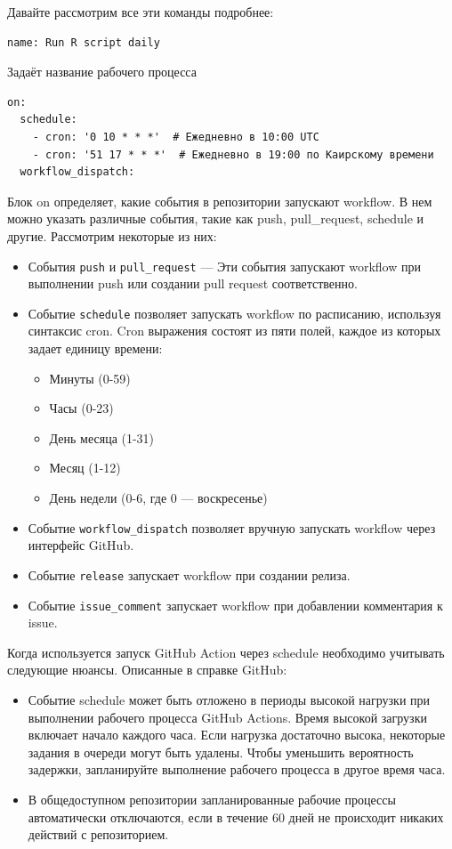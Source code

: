 \documentclass[
]{book}
\providecommand{\tightlist}{%
  \setlength{\itemsep}{0pt}\setlength{\parskip}{0pt}}
\begin{document}
Давайте рассмотрим все эти команды подробнее:

\begin{verbatim}
name: Run R script daily
\end{verbatim}

Задаёт название рабочего процесса

\begin{verbatim}
on:
  schedule:
    - cron: '0 10 * * *'  # Ежедневно в 10:00 UTC
    - cron: '51 17 * * *'  # Ежедневно в 19:00 по Каирскому времени
  workflow_dispatch:
\end{verbatim}

Блок on определяет, какие события в репозитории запускают workflow. В нем можно указать различные события, такие как push, pull\_request, schedule и другие. Рассмотрим некоторые из них:

\begin{itemize}
\tightlist
\item
  События \texttt{push} и \texttt{pull\_request} --- Эти события запускают workflow при выполнении push или создании pull request соответственно.
\item
  Событие \texttt{schedule} позволяет запускать workflow по расписанию, используя синтаксис cron. Cron выражения состоят из пяти полей, каждое из которых задает единицу времени:

  \begin{itemize}
  \tightlist
  \item
    Минуты (0-59)
  \item
    Часы (0-23)
  \item
    День месяца (1-31)
  \item
    Месяц (1-12)
  \item
    День недели (0-6, где 0 --- воскресенье)
  \end{itemize}
\item
  Событие \texttt{workflow\_dispatch} позволяет вручную запускать workflow через интерфейс GitHub.
\item
  Событие \texttt{release} запускает workflow при создании релиза.
\item
  Событие \texttt{issue\_comment} запускает workflow при добавлении комментария к issue.
\end{itemize}

Когда используется запуск GitHub Action через schedule необходимо учитывать следующие нюансы. Описанные в справке GitHub:

\begin{itemize}
\tightlist
\item
  Событие schedule может быть отложено в периоды высокой нагрузки при выполнении рабочего процесса GitHub Actions. Время высокой загрузки включает начало каждого часа. Если нагрузка достаточно высока, некоторые задания в очереди могут быть удалены. Чтобы уменьшить вероятность задержки, запланируйте выполнение рабочего процесса в другое время часа.
\item
  В общедоступном репозитории запланированные рабочие процессы автоматически отключаются, если в течение 60 дней не происходит никаких действий с репозиторием.
\end{itemize}
\end{document}
